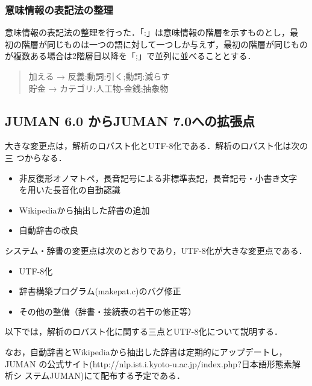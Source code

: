 \documentclass[a4j,titlepage]{jarticle}
\begin{document}
\subsubsection{意味情報の表記法の整理}

意味情報の表記法の整理を行った．「:」は意味情報の階層を示すものとし，最
初の階層が同じものは一つの語に対して一つしか与えず，最初の階層が同じもの
が複数ある場合は2階層目以降を「;」で並列に並べることとする．

\begin{quote}
 加える → 反義:動詞:引く;動詞:減らす \\
 貯金 → カテゴリ:人工物-金銭;抽象物 \\
\end{quote}


\subsection{JUMAN 6.0 からJUMAN 7.0への拡張点}
\label{subsec:7.0}

大きな変更点は，解析のロバスト化とUTF-8化である．解析のロバスト化は次の三
つからなる．

\begin{itemize}
\item 非反復形オノマトペ，長音記号による非標準表記，長音記号・小書き文字
      を用いた長音化の自動認識
\item Wikipediaから抽出した辞書の追加
\item 自動辞書の改良
\end{itemize}

システム・辞書の変更点は次のとおりであり，UTF-8化が大きな変更点である．
\begin{itemize}
\item UTF-8化
\item 辞書構築プログラム(makepat.c)のバグ修正
\item その他の整備（辞書・接続表の若干の修正等）
\end{itemize}

以下では，解析のロバスト化に関する三点とUTF-8化について説明する．

なお，自動辞書とWikipediaから抽出した辞書は定期的にアップデートし，JUMAN
の公式サイト(http://nlp.ist.i.kyoto-u.ac.jp/index.php?日本語形態素解析シ
ステムJUMAN)にて配布する予定である．
\end{document}
